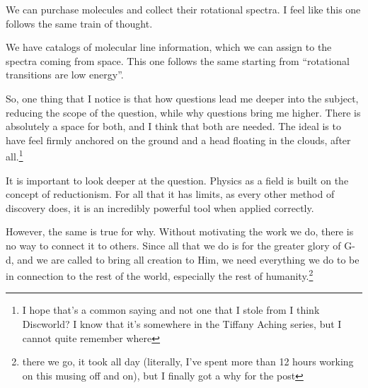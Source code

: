 \documentclass[12pt]{article}[titlepage]
\newcommand{\say}[1]{``#1''}
\renewcommand{\,}{\textsuperscript{,}}
\begin{document}
We can purchase molecules and collect their rotational spectra.
I feel like this one follows the same train of thought.

We have catalogs of molecular line information, which we can assign to the spectra coming from space.
This one follows the same starting from \say{rotational transitions are low energy}.

So, one thing that I notice is that how questions lead me deeper into the subject, reducing the scope of the question, while why questions bring me higher.
There is absolutely a space for both, and I think that both are needed.
The ideal is to have feel firmly anchored on the ground and a head floating in the clouds, after all.\footnote{I hope that's a common saying and not one that I stole from I think Discworld? I know that it's somewhere in the Tiffany Aching series, but I cannot quite remember where}

It is important to look deeper at the question.
Physics as a field is built on the concept of reductionism.
For all that it has limits, as every other method of discovery does, it is an incredibly powerful tool when applied correctly.

However, the same is true for why.
Without motivating the work we do, there is no way to connect it to others.
Since all that we do is for the greater glory of G-d, and we are called to bring all creation to Him, we need everything we do to be in connection to the rest of the world, especially the rest of humanity.\footnote{there we go, it took all day (literally, I've spent more than 12 hours working on this musing off and on), but I finally got a why for the post}
\end{document}
